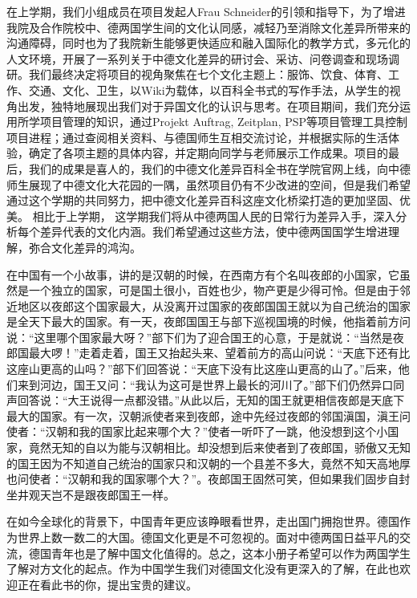 \par
 在上学期，我们小组成员在项目发起人Frau Schneider的引领和指导下，为了增进我院及合作院校中、德两国学生间的文化认同感，减轻乃至消除文化差异所带来的沟通障碍，同时也为了我院新生能够更快适应和融入国际化的教学方式，多元化的人文环境，开展了一系列关于中德文化差异的研讨会、采访、问卷调查和现场调研。我们最终决定将项目的视角聚焦在七个文化主题上：服饰、饮食、体育、工作、交通、文化、卫生，以Wiki为载体，以百科全书式的写作手法，从学生的视角出发，独特地展现出我们对于异国文化的认识与思考。在项目期间，我们充分运用所学项目管理的知识，通过Projekt Auftrag, Zeitplan, PSP等项目管理工具控制项目进程；通过查阅相关资料、与德国师生互相交流讨论，并根据实际的生活体验，确定了各项主题的具体内容，并定期向同学与老师展示工作成果。项目的最后，我们的成果是喜人的，我们的中德文化差异百科全书在学院官网上线，向中德师生展现了中德文化大花园的一隅，虽然项目仍有不少改进的空间，但是我们希望通过这个学期的共同努力，把中德文化差异百科这座文化桥梁打造的更加坚固、优美。 相比于上学期， 这学期我们将从中德两国人民的日常行为差异入手，深入分析每个差异代表的文化内涵。我们希望通过这些方法，使中德两国国学生增进理解，弥合文化差异的鸿沟。
 \par
 在中国有一个小故事，讲的是汉朝的时候，在西南方有个名叫夜郎的小国家，它虽然是一个独立的国家，可是国土很小，百姓也少，物产更是少得可怜。但是由于邻近地区以夜郎这个国家最大，从没离开过国家的夜郎国国王就以为自己统治的国家是全天下最大的国家。有一天，夜郎国国王与部下巡视国境的时候，他指着前方问说：“这里哪个国家最大呀？”部下们为了迎合国王的心意，于是就说：“当然是夜郎国最大啰！”走着走着，国王又抬起头来、望着前方的高山问说：“天底下还有比这座山更高的山吗？”部下们回答说：“天底下没有比这座山更高的山了。”后来，他们来到河边，国王又问：“我认为这可是世界上最长的河川了。”部下们仍然异口同声回答说：“大王说得一点都没错。”从此以后，无知的国王就更相信夜郎是天底下最大的国家。有一次，汉朝派使者来到夜郎，途中先经过夜郎的邻国滇国，滇王问使者：“汉朝和我的国家比起来哪个大？”使者一听吓了一跳，他没想到这个小国家，竟然无知的自以为能与汉朝相比。却没想到后来使者到了夜郎国，骄傲又无知的国王因为不知道自己统治的国家只和汉朝的一个县差不多大，竟然不知天高地厚也问使者：“汉朝和我的国家哪个大？”。夜郎国王固然可笑，但如果我们固步自封坐井观天岂不是跟夜郎国王一样。
 \par
 在如今全球化的背景下，中国青年更应该睁眼看世界，走出国门拥抱世界。德国作为世界上数一数二的大国。德国文化更是不可忽视的。面对中德两国日益平凡的交流，德国青年也是了解中国文化值得的。总之，这本小册子希望可以作为两国学生了解对方文化的起点。作为中国学生我们对德国文化没有更深入的了解，在此也欢迎正在看此书的你，提出宝贵的建议。
\vspace{\baselineskip} 
